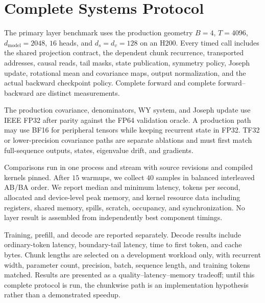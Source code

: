 \documentclass[11pt,letterpaper,logo]{yalearxiv}
\begin{document}
\section{Complete Systems Protocol}
\label{app:kdn2-runtime-protocol}

The primary layer benchmark uses the production geometry
$B=4$, $T=4096$, $d_{\mathrm{model}}=2048$, $16$ heads, and
$d_s=d_v=128$ on an H200. Every timed call includes the shared projection contract, the dependent
chunk recurrence, transported addresses, causal reads, tail masks, state publication, symmetry
policy, Joseph update, rotational mean and covariance maps, output normalization, and the actual
backward checkpoint policy. Complete forward and complete forward--backward are distinct
measurements.

The production covariance, denominators, WY system, and Joseph update use IEEE FP32 after parity
against the FP64 validation oracle. A production path may use BF16 for peripheral tensors while
keeping recurrent state in FP32. TF32 or
lower-precision covariance paths are separate ablations and must first match full-sequence
outputs, states, eigenvalue drift, and gradients.

Comparisons run in one process and stream with source revisions and compiled kernels pinned. After
$15$ warmups, we collect $40$ samples in balanced interleaved AB/BA order. We report median and
minimum latency, tokens per
second, allocated and device-level peak memory, and kernel resource data including registers,
shared memory, spills, scratch, occupancy, and synchronization. No layer result is assembled from
independently best component timings.

Training, prefill, and decode are reported separately. Decode results include ordinary-token
latency, boundary-tail latency, time to first token, and cache bytes. Chunk lengths are selected on
a development workload only, with recurrent width, parameter count, precision, batch, sequence
length, and training tokens matched. Results are presented as a quality--latency--memory tradeoff;
until this complete protocol is run, the chunkwise path is an implementation hypothesis rather
than a demonstrated speedup.
\end{document}
